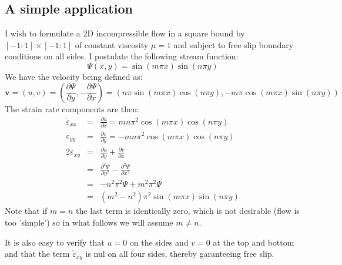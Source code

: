 \subsection{A simple application}
I wish to formulate a 2D incompressible flow in a square bound by $[-1:1]\times[-1:1]$
of constant viscosity $\mu=1$ and subject to free slip boundary conditions on all sides.
I postulate the following stream function:
\begin{equation}
\Psi(x,y)=\sin( m \pi x)\sin( n\pi y)
\end{equation}
We have the velocity being defined as:
\begin{equation}
{\bm v} = (u,v) = \left( \frac{\partial \Psi}{\partial y},-\frac{\partial \Psi}{\partial x} \right) 
= (n \pi \sin (m\pi x)\cos(n\pi y),-m\pi \cos(m\pi x)\sin (n\pi y))
\end{equation}
The strain rate components are then:
\begin{eqnarray}
\dot\varepsilon_{xx} &=&  \frac{\partial u}{\partial x} = mn \pi^ 2  \cos (m\pi x)\cos(n\pi y)   \\
\dot\varepsilon_{yy} &=&  \frac{\partial v}{\partial y} = -mn \pi^ 2  \cos (m\pi x)\cos(n\pi y)  \\
2\dot\varepsilon_{xy} &=&  \frac{\partial u}{\partial y} +  \frac{\partial v}{\partial x}    \\
&=&  \frac{\partial^2 \Psi}{\partial y^2} -  \frac{\partial^2 \Psi}{\partial x^2}    \\
&=& -n^2\pi^2 \Psi + m^2 \pi^2 \Psi \\
&=& (m^2-n^2) \pi^2   \sin( m \pi x)\sin( n\pi y)
\end{eqnarray}
Note that if $m=n$ the last term is identically zero, which is not desirable 
(flow is too 'simple')
so in what follows we will assume $m\neq n$.

It is also easy to verify that $u=0$ on the sides and $v=0$ at the top and bottom and that the 
term $\dot\varepsilon_{xy}$ is nul on all four sides, thereby garanteeing free slip. 

